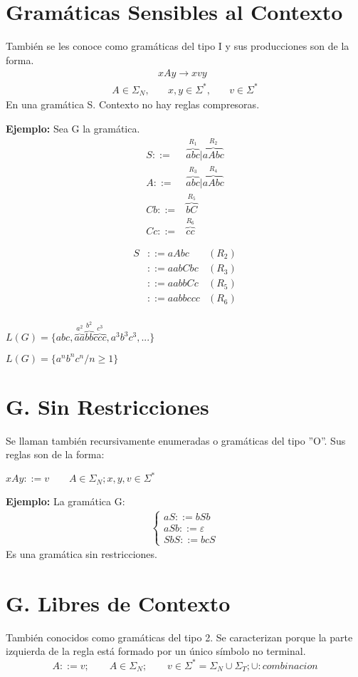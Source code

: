\section{Gramáticas Sensibles al Contexto}
También se les conoce como gramáticas del tipo I y sus producciones son de la forma.
\begin{align*}
&xAy\rightarrow xvy&\\
A\in\Sigma_N,&\quad x,y\in\Sigma^*,&\quad v\in\Sigma^*
\end{align*}
En una gramática S. Contexto no hay reglas compresoras.

\textbf{Ejemplo: }Sea G la gramática.
\begin{align*}
S::=&\overbrace{abc}^{R_1}|\overbrace{aAbc}^{R_2}	\\
A::=&\overbrace{abc}^{R_3}|\overbrace{aAbc}^{R_4}	\\
Cb::=&\overbrace{bC}^{R_5}	\\
Cc::=&\overbrace{cc}^{R_6}
\end{align*}

\begin{align*}
S	&::=aAbc	&(R_2)	\\
	&::=aabCbc	&(R_3)	\\
	&::=aabbCc	&(R_5)	\\
	&::=aabbccc	&(R_6)	\\
\end{align*}

$L(G)=\{abc,\overbrace{aa}^{a^2}\overbrace{bb}^{b^2}\overbrace{ccc}^{c^3}, a^3b^3c^3,...\}$

$L(G)=\{a^nb^nc^n/n\geq 1\}$

\section{G. Sin Restricciones}
Se llaman también recursivamente enumeradas o gramáticas del tipo ''O''. Sus reglas son de la forma:

$xAy::=v\qquad A\in\Sigma_N;x,y,v\in\Sigma^*	$

\textbf{Ejemplo: }La gramática G:
\begin{align*}
\left \{ \begin{array}{c}
aS::=bSb	\\
aSb::=\varepsilon	\\
SbS::=bcS
\end{array}\right.
\end{align*}
Es una gramática sin restricciones.

\section{G. Libres de Contexto}
También conocidos como gramáticas del tipo 2. Se caracterizan porque la parte izquierda de la regla está formado por un único símbolo no terminal.
$$A::=v;	\qquad A\in\Sigma_N; \qquad v\in\Sigma^*=\Sigma_N\cup\Sigma_T;\cup:  combinacion$$

